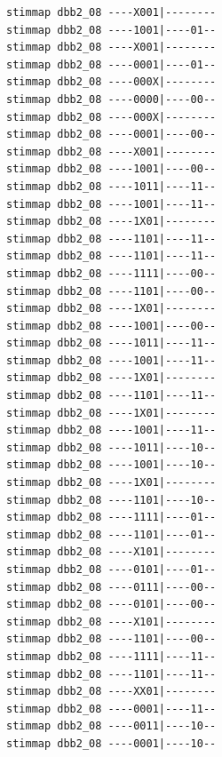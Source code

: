 \documentclass[fleqn]{article}
\begin{document}
\begin{lstlisting}
stimmap dbb2_08 ----X001|--------
stimmap dbb2_08 ----1001|----01--
stimmap dbb2_08 ----X001|--------
stimmap dbb2_08 ----0001|----01--
stimmap dbb2_08 ----000X|--------
stimmap dbb2_08 ----0000|----00--
stimmap dbb2_08 ----000X|--------
stimmap dbb2_08 ----0001|----00--
stimmap dbb2_08 ----X001|--------
stimmap dbb2_08 ----1001|----00--
stimmap dbb2_08 ----1011|----11--
stimmap dbb2_08 ----1001|----11--
stimmap dbb2_08 ----1X01|--------
stimmap dbb2_08 ----1101|----11--
stimmap dbb2_08 ----1101|----11--
stimmap dbb2_08 ----1111|----00--
stimmap dbb2_08 ----1101|----00--
stimmap dbb2_08 ----1X01|--------
stimmap dbb2_08 ----1001|----00--
stimmap dbb2_08 ----1011|----11--
stimmap dbb2_08 ----1001|----11--
stimmap dbb2_08 ----1X01|--------
stimmap dbb2_08 ----1101|----11--
stimmap dbb2_08 ----1X01|--------
stimmap dbb2_08 ----1001|----11--
stimmap dbb2_08 ----1011|----10--
stimmap dbb2_08 ----1001|----10--
stimmap dbb2_08 ----1X01|--------
stimmap dbb2_08 ----1101|----10--
stimmap dbb2_08 ----1111|----01--
stimmap dbb2_08 ----1101|----01--
stimmap dbb2_08 ----X101|--------
stimmap dbb2_08 ----0101|----01--
stimmap dbb2_08 ----0111|----00--
stimmap dbb2_08 ----0101|----00--
stimmap dbb2_08 ----X101|--------
stimmap dbb2_08 ----1101|----00--
stimmap dbb2_08 ----1111|----11--
stimmap dbb2_08 ----1101|----11--
stimmap dbb2_08 ----XX01|--------
stimmap dbb2_08 ----0001|----11--
stimmap dbb2_08 ----0011|----10--
stimmap dbb2_08 ----0001|----10--
\end{lstlisting}
\end{document}
